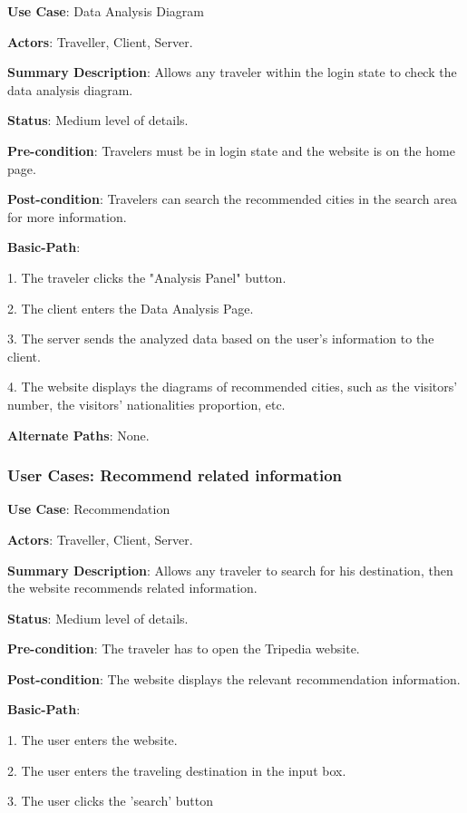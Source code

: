 \documentclass[conference]{IEEEtran}
\begin{document}
\textbf{ }

\textbf{Use Case}: Data Analysis Diagram

\textbf{Actors}: Traveller, Client, Server.

\textbf{Summary Description}: Allows any traveler within the login state to check the data analysis diagram.
 
\textbf{Status}: Medium level of details.

\textbf{Pre-condition}: Travelers must be in login state and the website is on the home page.

\textbf{Post-condition}: Travelers can search the recommended cities in the search area for more information.

\textbf{Basic-Path}:

1. The traveler clicks the "Analysis Panel" button.

2. The client enters the Data Analysis Page.

3. The server sends the analyzed data based on the user's information to the client.

4. The website displays the diagrams of recommended cities, such as the visitors' number, the visitors' nationalities proportion, etc.

\textbf{Alternate Paths}: None.

\subsubsection{User Cases: Recommend related information}

\textbf{ }

\textbf{Use Case}: Recommendation

\textbf{Actors}: Traveller, Client, Server.

\textbf{Summary Description}: Allows any traveler to search for his destination, then the website recommends related information.

\textbf{Status}: Medium level of details.

\textbf{Pre-condition}: The traveler has to open the Tripedia website.

\textbf{Post-condition}: The website displays the relevant recommendation information.

\textbf{Basic-Path}:

1. The user enters the website.

2. The user enters the traveling destination in the input box.

3. The user clicks the 'search' button
\end{document}
